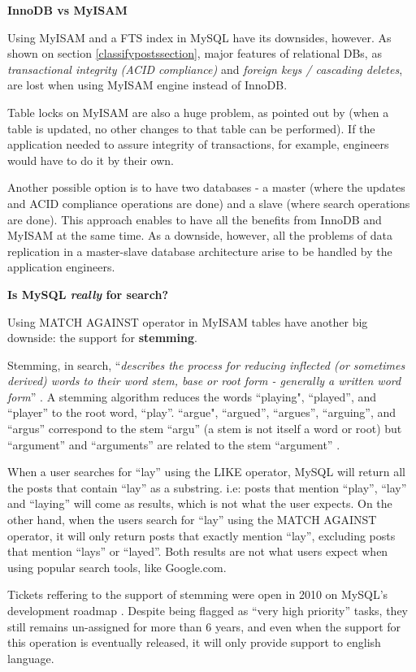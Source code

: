 \textbf{InnoDB vs MyISAM}

Using MyISAM and a FTS index in MySQL have its downsides, however. As shown on section \ref{classifypostssection}, major features of relational DBs, as \textit{transactional integrity (ACID compliance)} and \textit{foreign keys / cascading deletes},  are lost when using MyISAM engine instead of InnoDB. 

Table locks on MyISAM are also a huge problem, as pointed out by \cite{scoutmigration} (when a table is updated, no other changes to that table can be performed). If the application needed to assure integrity of transactions, for example, engineers would have to do it by their own.

Another possible option is to have two databases - a master (where the updates and ACID compliance operations are done) and a slave (where search operations are done). This approach enables to have all the benefits from InnoDB and MyISAM at the same time. As a downside, however, all the problems of data replication in a master-slave database architecture arise to be handled by the application engineers. 


\textbf{Is MySQL \textit{really} for search?}

Using MATCH AGAINST operator in MyISAM tables have another big downside: the support for \textbf{stemming}.

Stemming, in search, ``\textit{describes the process for reducing inflected (or sometimes derived) words to their word stem, base or root form - generally a written word form}'' \cite{stemming}. A stemming algorithm reduces the words ``playing", ``played'', and ``player'' to the root word, ``play''. ``argue", ``argued'', ``argues'', ``arguing'', and ``argus'' correspond to the stem ``argu'' (a stem is not itself a word or root) but ``argument'' and ``arguments'' are related to the stem ``argument'' \cite{stemming}.

When a user searches for ``lay'' using the LIKE operator, MySQL will return all the posts that contain ``lay'' as a substring. i.e: posts that mention ``play'', ``lay'' and ``laying'' will come as results, which is not what the user expects. On the other hand, when the users search for ``lay'' using the MATCH AGAINST operator, it will only return posts that exactly mention ``lay'', excluding posts that mention ``lays'' or ``layed''. Both results are not what users expect when using popular search tools, like Google.com.

Tickets reffering to the support of stemming were open in 2010 on MySQL's development roadmap \cite{dictionarymysql} \cite{stemmingmysql}. Despite being flagged as ``very high priority'' tasks, they still remains un-assigned for more than 6 years, and even when the support for this operation is eventually released, it will only provide support to english language. 

